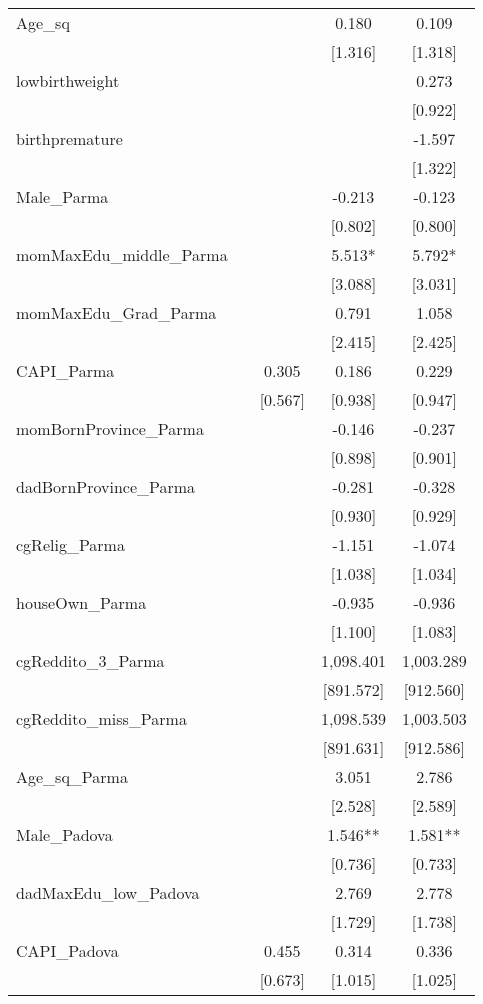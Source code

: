 \documentclass[]{article}
\begin{document}
\begin{tabular}{lcccc}
Age\_sq &  &  & 0.180 & 0.109 \\
 &  &  & [1.316] & [1.318] \\
lowbirthweight &  &  &  & 0.273 \\
 &  &  &  & [0.922] \\
birthpremature &  &  &  & -1.597 \\
 &  &  &  & [1.322] \\
Male\_Parma &  &  & -0.213 & -0.123 \\
 &  &  & [0.802] & [0.800] \\
momMaxEdu\_middle\_Parma &  &  & 5.513* & 5.792* \\
 &  &  & [3.088] & [3.031] \\
momMaxEdu\_Grad\_Parma &  &  & 0.791 & 1.058 \\
 &  &  & [2.415] & [2.425] \\
CAPI\_Parma &  & 0.305 & 0.186 & 0.229 \\
 &  & [0.567] & [0.938] & [0.947] \\
momBornProvince\_Parma &  &  & -0.146 & -0.237 \\
 &  &  & [0.898] & [0.901] \\
dadBornProvince\_Parma &  &  & -0.281 & -0.328 \\
 &  &  & [0.930] & [0.929] \\
cgRelig\_Parma &  &  & -1.151 & -1.074 \\
 &  &  & [1.038] & [1.034] \\
houseOwn\_Parma &  &  & -0.935 & -0.936 \\
 &  &  & [1.100] & [1.083] \\
cgReddito\_3\_Parma &  &  & 1,098.401 & 1,003.289 \\
 &  &  & [891.572] & [912.560] \\
cgReddito\_miss\_Parma &  &  & 1,098.539 & 1,003.503 \\
 &  &  & [891.631] & [912.586] \\
Age\_sq\_Parma &  &  & 3.051 & 2.786 \\
 &  &  & [2.528] & [2.589] \\
Male\_Padova &  &  & 1.546** & 1.581** \\
 &  &  & [0.736] & [0.733] \\
dadMaxEdu\_low\_Padova &  &  & 2.769 & 2.778 \\
 &  &  & [1.729] & [1.738] \\
CAPI\_Padova &  & 0.455 & 0.314 & 0.336 \\
 &  & [0.673] & [1.015] & [1.025] \\

\end{tabular}
\end{document}
